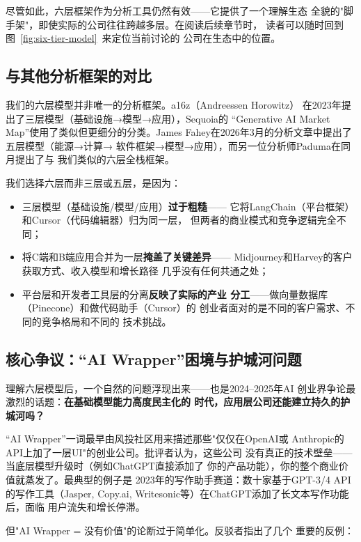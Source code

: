 尽管如此，六层框架作为分析工具仍然有效——它提供了一个理解生态
全貌的"脚手架"，即使实际的公司往往跨越多层。在阅读后续章节时，
读者可以随时回到图~\ref{fig:six-tier-model}~来定位当前讨论的
公司在生态中的位置。

\subsection{与其他分析框架的对比}

我们的六层模型并非唯一的分析框架。a16z（Andreessen Horowitz）
在2023年提出了三层模型（基础设施→模型→应用），Sequoia的
``Generative AI Market Map''使用了类似但更细分的分类。James
Fahey在2026年3月的分析文章中提出了五层模型（能源→计算→
软件框架→模型→应用），而另一位分析师Paduma在同月提出了与
我们类似的六层全栈框架。

我们选择六层而非三层或五层，是因为：

\begin{itemize}
  \item 三层模型（基础设施/模型/应用）\textbf{过于粗糙}——
    它将LangChain（平台框架）和Cursor（代码编辑器）归为同一层，
    但两者的商业模式和竞争逻辑完全不同；
  \item 将C端和B端应用合并为一层\textbf{掩盖了关键差异}——
    Midjourney和Harvey的客户获取方式、收入模型和增长路径
    几乎没有任何共通之处；
  \item 平台层和开发者工具层的分离\textbf{反映了实际的产业
    分工}——做向量数据库（Pinecone）和做代码助手（Cursor）的
    创业者面对的是不同的客户需求、不同的竞争格局和不同的
    技术挑战。
\end{itemize}

\subsection{核心争议：``AI Wrapper''困境与护城河问题}

理解六层模型后，一个自然的问题浮现出来——也是2024--2025年AI
创业界争论最激烈的话题：\textbf{在基础模型能力高度民主化的
时代，应用层公司还能建立持久的护城河吗？}

``AI Wrapper''一词最早由风投社区用来描述那些"仅仅在OpenAI或
Anthropic的API上加了一层UI"的创业公司。批评者认为，这些公司
没有真正的技术壁垒——当底层模型升级时（例如ChatGPT直接添加了
你的产品功能），你的整个商业价值就蒸发了。最典型的例子是
2023年的写作助手赛道：数十家基于GPT-3/4 API的写作工具（Jasper,
Copy.ai, Writesonic等）在ChatGPT添加了长文本写作功能后，面临
用户流失和增长停滞。

但"AI Wrapper = 没有价值"的论断过于简单化。反驳者指出了几个
重要的反例：

